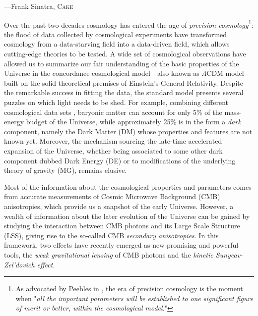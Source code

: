 \setlength{\epigraphwidth}{.45\textwidth}
\begin{epigraphs}
%
 {---Frank Sinatra, \textsc{Cake}}
\end{epigraphs}

Over the past two decades cosmology has entered the age of \textit{precision cosmology}\footnote{As advocated by Peebles in \cite{Peebles2002}, the era of precision cosmology is the moment when "\textit{all the important parameters will be established to one significant figure of merit or better, within the cosmological model.}"}: the flood of data collected by  cosmological experiments have transformed cosmology from a data-starving field into a data-driven field, which allows cutting-edge theories to be tested. 
A wide set of cosmological observations \citep{Weinberg2008} have allowed us to summarize our fair understanding of the basic properties of the Universe in the concordance cosmological model - also known as $\Lambda$CDM model - built on the solid theoretical premises of Einstein's General Relativity. Despite the remarkable success in fitting the data, the standard model presents several puzzles on which light needs to be shed. For example, combining different cosmological data sets \citep{PlanckCollaboration2015b}, baryonic matter can account for only 5\% of the mass-energy budget of the Universe, while approximately 25\% is in the form a \textit{dark} component, namely the Dark Matter (DM) whose properties and features are not known yet. Moreover, the mechanism sourcing the late-time accelerated expansion of the Universe, whether being associated to some other dark component dubbed Dark Energy (DE) or to modifications of the underlying theory of gravity (MG), remains elusive.

Most of the information about the cosmological properties and parameters comes from accurate measurements of Cosmic Microwave Background (CMB) anisotropies, which provide us a snapshot of the early Universe. However, a wealth of information about the later evolution of the Universe can be gained by studying the interaction between CMB photons and its Large Scale Structure (LSS), giving rise to the so-called CMB \textit{secondary anisotropies}. In this framework, two effects have recently emerged as new promising and powerful tools, the \textit{weak gravitational lensing} of CMB photons and the \textit{kinetic Sunyeav-Zel'dovich effect}. 

